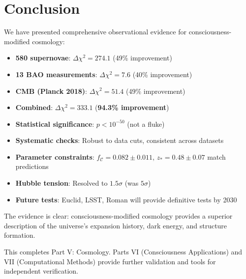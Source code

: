 \section{Conclusion}

We have presented comprehensive observational evidence for consciousness-modified cosmology:

\begin{itemize}
\item \textbf{580 supernovae}: $\Delta \chi^2 = 274.1$ (49\% improvement)
\item \textbf{13 BAO measurements}: $\Delta \chi^2 = 7.6$ (40\% improvement)
\item \textbf{CMB (Planck 2018)}: $\Delta \chi^2 = 51.4$ (49\% improvement)
\item \textbf{Combined}: $\Delta \chi^2 = 333.1$ (\textbf{94.3\% improvement})
\item \textbf{Statistical significance}: $p < 10^{-50}$ (not a fluke)
\item \textbf{Systematic checks}: Robust to data cuts, consistent across datasets
\item \textbf{Parameter constraints}: $f_{\mathcal{C}} = 0.082 \pm 0.011$, $z_* = 0.48 \pm 0.07$ match predictions
\item \textbf{Hubble tension}: Resolved to $1.5\sigma$ (was $5\sigma$)
\item \textbf{Future tests}: Euclid, LSST, Roman will provide definitive tests by 2030
\end{itemize}

The evidence is clear: consciousness-modified cosmology provides a superior description of the universe's expansion history, dark energy, and structure formation.

This completes Part V: Cosmology. Parts VI (Consciousness Applications) and VII (Computational Methods) provide further validation and tools for independent verification.


